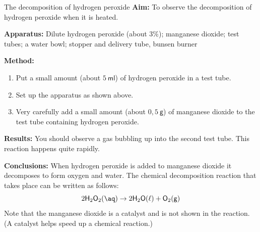             \begin{g_experiment}{The decomposition of hydrogen peroxide}
            \nopagebreak
            \label{m38709*id63175}\noindent{}\textbf{Aim:}\newline
    To observe the decomposition of hydrogen peroxide when it is heated.\par 
        \label{m38709*id63194}\noindent{}\textbf{Apparatus:}\newline
    Dilute hydrogen peroxide (about 3\%); manganese dioxide; test tubes; a water bowl; stopper and delivery tube, bunsen burner\par 
        \label{m38709*eip-470}
	\par
      \label{m38709*id63199}
    \setcounter{subfigure}{0}
	\begin{figure}[H] %
    \begin{center}
    \end{center}
 \end{figure}       
        \par 
        \label{m38709*id63206}\noindent{}\textbf{Method:}\label{m38709*id63212}\begin{enumerate}[noitemsep, label=\textbf{\arabic*}. ] 
            \label{m38709*uid11}\item Put a small amount (about $5~\mathsf{ml}$) of hydrogen peroxide in a test tube.
\label{m38709*uid12}\item Set up the apparatus as shown above.
\label{m38709*uid13}\item Very carefully add a small amount (about $0,5~\mathsf{g}$) of manganese dioxide to the test tube containing hydrogen peroxide. 
\end{enumerate}
        \par 
        \label{m38709*id63254}\noindent{}\textbf{Results:}\newline
    You should observe a gas bubbling up into the second test tube. This reaction happens quite rapidly. \par 
        \label{m38709*id63302}\noindent{}\textbf{Conclusions:}\newline
    When hydrogen peroxide is added to manganese dioxide it decomposes to form oxygen and water. The chemical decomposition reaction that takes place can be written as follows:
        \label{m38709*id63313}\nopagebreak\noindent{}
    \begin{equation}
    2{\mathsf{H}}_{2}{\mathsf{O}}_{2} \mathsf{(\aq)} \to 2\mathsf{H}_{2}\mathsf{O}\mathsf{(\ell)}+{\mathsf{O}}_{2}\mathsf{(g)}
      \end{equation}
Note that the manganese dioxide is a catalyst and is not shown in the reaction. (A catalyst helps speed up a chemical reaction.)    \par 
\end{g_experiment}
